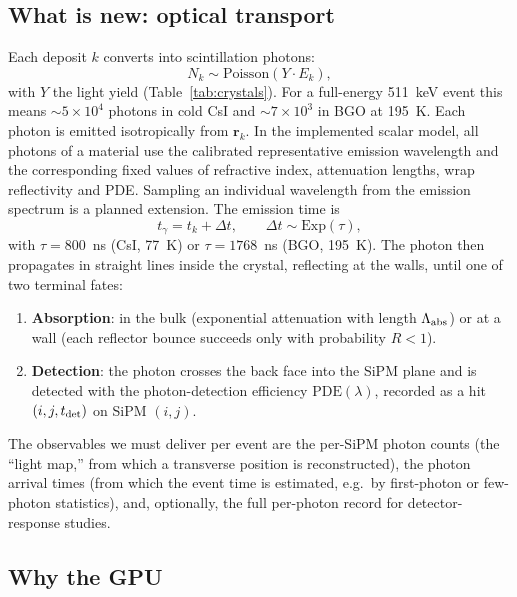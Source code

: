 \documentclass[11pt,a4paper]{article}
\newcommand{\csi}{CsI}
\newcommand{\bgo}{BGO}
\begin{document}
\subsection{What is new: optical transport}

Each deposit $k$ converts into scintillation photons:
\begin{equation}
  N_k \sim \mathrm{Poisson}\!\left( Y \cdot E_k \right),
\end{equation}
with $Y$ the light yield (Table~\ref{tab:crystals}). For a full-energy 511~keV event this
means $\sim 5\times10^4$ photons in cold \csi{} and $\sim 7\times10^3$ in \bgo{} at 195~K.
Each photon is emitted isotropically from $\mathbf{r}_k$. In the implemented scalar model,
all photons of a material use the calibrated representative emission wavelength and the
corresponding fixed values of refractive index, attenuation lengths, wrap reflectivity and
PDE. Sampling an individual wavelength from the emission spectrum is a planned extension.
The emission time is
\begin{equation}
  t_{\gamma} = t_k + \Delta t, \qquad \Delta t \sim \mathrm{Exp}(\tau),
  \label{eq:emission-time}
\end{equation}
with $\tau = 800$~ns (\csi{}, 77~K) or $\tau = 1768$~ns (\bgo{}, 195~K). The photon then
propagates in straight lines inside the crystal, reflecting at the walls, until one of two
terminal fates:
\begin{enumerate}
  \item \textbf{Absorption}: in the bulk (exponential attenuation with length
    $\Lambda_{\rm abs}$) or at a wall (each reflector bounce succeeds only with probability
    $R < 1$).
  \item \textbf{Detection}: the photon crosses the back face into the SiPM plane and is
    detected with the photon-detection efficiency $\mathrm{PDE}(\lambda)$, recorded as a hit
    $(i, j, t_{\rm det})$ on SiPM $(i,j)$.
\end{enumerate}
The observables we must deliver per event are the per-SiPM photon counts (the ``light map,''
from which a transverse position is reconstructed), the photon arrival times (from which the
event time is estimated, e.g.\ by first-photon or few-photon statistics), and, optionally, the
full per-photon record for detector-response studies.

\subsection{Why the GPU}
\end{document}
